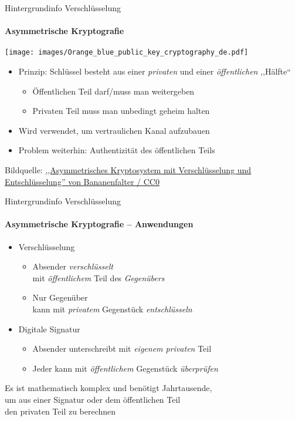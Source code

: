 \begin{frame}{Hintergrundinfo Verschlüsselung}
  \framesubtitle{Asymmetrische Kryptografie}
  \begin{center}
    \texttt{[image: images/Orange\_blue\_public\_key\_cryptography\_de.pdf]}
  \end{center}
  \begin{itemize}
    \item Prinzip: Schlüssel besteht aus einer \emph{privaten} und einer \emph{öffentlichen} ,,Hälfte``
    \begin{itemize}
      \item Öffentlichen Teil darf/muss man weitergeben
      \item Privaten Teil muss man unbedingt geheim halten
    \end{itemize}
    \item Wird verwendet, um vertraulichen Kanal aufzubauen
    \item Problem weiterhin: Authentizität des öffentlichen Teils
  \end{itemize}
  \tiny Bildquelle: \href{https://commons.wikimedia.org/wiki/File:Orange_blue_public_key_cryptography_de.svg}{,,Asymmetrisches Kryptosystem mit Verschlüsselung und Entschlüsselung'' von Bananenfalter / CC0}
\end{frame}

\begin{frame}{Hintergrundinfo Verschlüsselung}
  \framesubtitle{Asymmetrische Kryptografie -- Anwendungen}
  \begin{itemize}
    \item Verschlüsselung
      \begin{itemize}
        \item Absender \emph{verschlüsselt}\\ mit \emph{öffentlichem} Teil des \emph{Gegenübers}
        \item Nur Gegenüber\\ kann mit \emph{privatem} Gegenstück \emph{entschlüsseln}
      \end{itemize}
    \item Digitale Signatur
      \begin{itemize}
        \item Absender unterschreibt mit \emph{eigenem privaten} Teil
        \item Jeder kann mit \emph{öffentlichem} Gegenstück \emph{überprüfen}
      \end{itemize}
  \end{itemize}
  Es ist mathematisch komplex und benötigt Jahrtausende,\\ um aus einer Signatur oder dem öffentlichen Teil\\ den privaten Teil zu berechnen
\end{frame}

